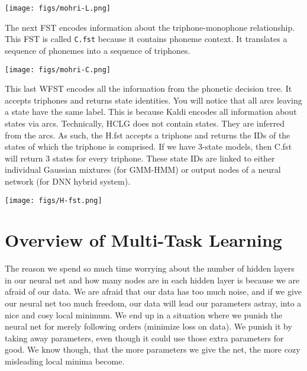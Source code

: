 \documentclass[10pt,a4paper]{article}
\begin{document}
\begin{center}
  \texttt{[image: figs/mohri-L.png]}
\end{center}

The next FST encodes information about the triphone-monophone relationship. This FST is called \texttt{C.fst} because it contains phoneme context. It translates a sequence of phonemes into a sequence of triphones.

\begin{center}
  \texttt{[image: figs/mohri-C.png]}
\end{center}

This last WFST encodes all the information from the phonetic decision tree. It accepts triphones and returns state identities. You will notice that all arcs leaving a state have the same label. This is because Kaldi encodes all information about states via arcs. Technically, HCLG does not contain states. They are inferred from the arcs. As such, the H.fst accepts a triphone and returns the IDs of the states of which the triphone is comprised. If we have 3-state models, then C.fst will return 3 states for every triphone. These state IDs are linked to either individual Gaussian mixtures (for GMM-HMM) or output nodes of a neural network (for DNN hybrid system).


\begin{center}
  \texttt{[image: figs/H-fst.png]}
\end{center}











\newpage

\section{Overview of Multi-Task Learning}


The reason we spend so much time worrying about the number of hidden layers in our neural net and how many nodes are in each hidden layer is because we are afraid of our data. We are afraid that our data has too much noise, and if we give our neural net too much freedom, our data will lead our parameters astray, into a nice and cosy local minimum. We end up in a situation where we punish the neural net for merely following orders (minimize loss on data). We punish it by taking away parameters, even though it could use those extra parameters for good. We know though, that the more parameters we give the net, the more cozy misleading local minima become.
\end{document}
